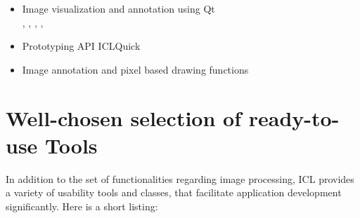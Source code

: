 \begin{itemize}
\item Image visualization and annotation using Qt\\
, , , ,

\item Prototyping API ICLQuick\\

\item Image annotation and pixel based drawing functions\\

\end{itemize}



\section{Well-chosen selection of ready-to-use Tools}
In addition to the set of functionalities regarding image processing, ICL provides a variety of usability tools and classes, that facilitate application development significantly. Here is a short listing:

